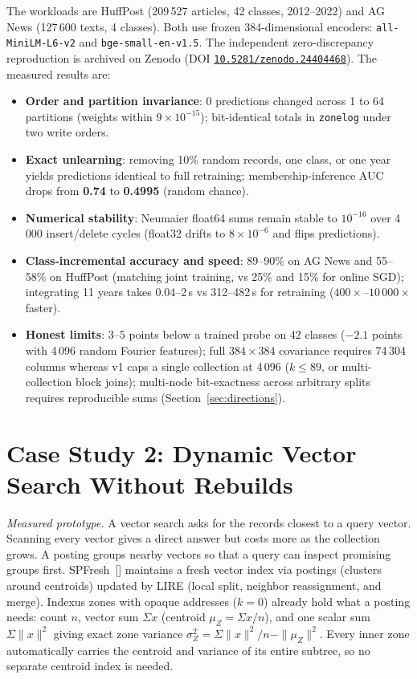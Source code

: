 \documentclass[11pt]{article}
\begin{document}
The workloads are HuffPost (209\,527 articles, 42 classes, 2012--2022) and AG News (127\,600 texts, 4 classes). Both use frozen 384-dimensional encoders: \texttt{all-MiniLM-L6-v2} and \texttt{bge-small-en-v1.5}. The independent zero-discrepancy reproduction is archived on Zenodo (DOI \href{https://doi.org/10.5281/zenodo.24404468}{\nolinkurl{10.5281/zenodo.24404468}}). The measured results are:
\begin{itemize}[leftmargin=1.5em,itemsep=1pt]
  \item \textbf{Order and partition invariance}: 0 predictions changed across 1 to 64 partitions (weights within $9\times 10^{-15}$); bit-identical totals in \texttt{zonelog} under two write orders.
  \item \textbf{Exact unlearning}: removing 10\% random records, one class, or one year yields predictions identical to full retraining; membership-inference AUC drops from \textbf{0.74} to \textbf{0.4995} (random chance).
  \item \textbf{Numerical stability}: Neumaier float64 sums remain stable to $10^{-16}$ over 4\,000 insert/delete cycles (float32 drifts to $8\times 10^{-6}$ and flips predictions).
  \item \textbf{Class-incremental accuracy and speed}: 89--90\% on AG News and 55--58\% on HuffPost (matching joint training, vs 25\% and 15\% for online SGD); integrating 11 years takes 0.04--2\,s vs 312--482\,s for retraining ($400\times$--$10\,000\times$ faster).
  \item \textbf{Honest limits}: 3--5 points below a trained probe on 42 classes ($-2.1$ points with 4\,096 random Fourier features); full $384\times 384$ covariance requires 74\,304 columns whereas v1 caps a single collection at 4\,096 ($k \le 89$, or multi-collection block joins); multi-node bit-exactness across arbitrary splits requires reproducible sums (Section~\ref{sec:directions}).
\end{itemize}

\section{Case Study 2: Dynamic Vector Search Without Rebuilds}\hypertarget{ix:vectors}{}
\noindent\emph{Measured prototype.}
A vector search asks for the records closest to a query vector. Scanning every vector gives a direct answer but costs more as the collection grows. A posting groups nearby vectors so that a query can inspect promising groups first. SPFresh~[] maintains a fresh vector index via postings (clusters around centroids) updated by LIRE (local split, neighbor reassignment, and merge). Indexus zones with opaque addresses ($k=0$) already hold what a posting needs: count $n$, vector sum $\Sigma x$ (centroid $\mu_Z = \Sigma x / n$), and one scalar sum $\Sigma \|x\|^2$ giving exact zone variance $\sigma_Z^2 = \Sigma \|x\|^2 / n - \|\mu_Z\|^2$. Every inner zone automatically carries the centroid and variance of its entire subtree, so no separate centroid index is needed.
\end{document}
